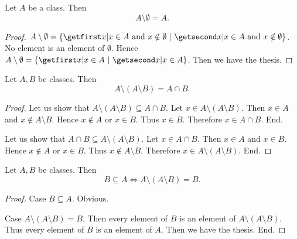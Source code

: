 \documentclass[../set-theory.tex]{subfiles}
\begin{document}
  \begin{forthel}
    \begin{proposition}\label{SET_THEORY_02_3783696985358336}
      Let $A$ be a class.
      Then \[ A \setminus \emptyset = A. \]
    \end{proposition}
    \begin{proof}
      $A \setminus \emptyset = \class{ x | \text{$x \in A$ and $x \notin \emptyset$} }$.
      No element is an element of $\emptyset$.
      Hence $A \setminus \emptyset = \class{ x | x \in A }$.
      Then we have the thesis.
    \end{proof}
  \end{forthel}

  \begin{forthel}
    \begin{proposition}\label{SET_THEORY_02_7083929257377792}
      Let $A, B$ be classes.
      Then \[ A \setminus (A \setminus B) = A \cap B. \]
    \end{proposition}
    \begin{proof}
      Let us show that $A \setminus (A \setminus B) \subseteq A \cap B$.
        Let $x \in A \setminus (A \setminus B)$.
        Then $x \in A$ and $x \notin A \setminus B$.
        Hence $x \notin A$ or $x \in B$.
        Thus $x \in B$.
        Therefore $x \in A \cap B$.
      End.

      Let us show that $A \cap B \subseteq A \setminus (A \setminus B)$.
        Let $x \in A \cap B$.
        Then $x \in A$ and $x \in B$.
        Hence $x \notin A$ or $x \in B$.
        Thus $x \notin A \setminus B$.
        Therefore $x \in A \setminus (A \setminus B)$.
      End.
    \end{proof}
  \end{forthel}

  \begin{forthel}
    \begin{proposition}\label{SET_THEORY_02_4938646769631232}
      Let $A, B$ be classes.
      Then \[ B \subseteq A \iff A \setminus (A \setminus B) = B. \]
    \end{proposition}
    \begin{proof}
      Case $B \subseteq A$. Obvious.

      Case $A \setminus (A \setminus B) = B$.
        Then every element of $B$ is an element of $A \setminus
        (A \setminus B)$.
        Thus every element of $B$ is an element of $A$.
        Then we have the thesis.
      End.
    \end{proof}
  \end{forthel}
\end{document}
